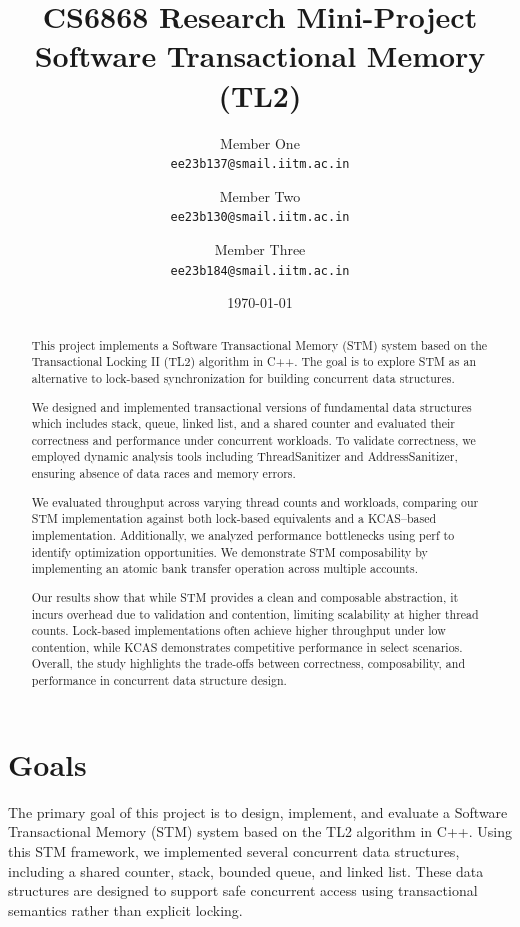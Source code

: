 \documentclass[11pt,a4paper]{article}
\title{%
  \textbf{CS6868 Research Mini-Project} \\[0.3em]
  \Large Software Transactional Memory (TL2)%
}
\author{%
  Member One \\ \texttt{ee23b137@smail.iitm.ac.in}
  \and
  Member Two \\ \texttt{ee23b130@smail.iitm.ac.in}
  \and
  Member Three \\ \texttt{ee23b184@smail.iitm.ac.in}
}
\date{\today}
\begin{document}
\maketitle

\begin{abstract}
This project implements a Software Transactional Memory (STM) system based on the Transactional Locking II (TL2) algorithm in C++. The goal is to explore STM as an alternative to lock-based synchronization for building concurrent data structures.

We designed and implemented transactional versions of fundamental data structures which includes stack, queue, linked list, and a shared counter and evaluated their correctness and performance under concurrent workloads. To validate correctness, we employed dynamic analysis tools including ThreadSanitizer and AddressSanitizer, ensuring absence of data races and memory errors.

We evaluated throughput across varying thread counts and workloads, comparing our STM implementation against both lock-based equivalents and a KCAS–based implementation. Additionally, we analyzed performance bottlenecks using perf to identify optimization opportunities.
We demonstrate STM composability by implementing an atomic bank transfer operation across multiple accounts.

Our results show that while STM provides a clean and composable abstraction, it incurs overhead due to validation and contention, limiting scalability at higher thread counts. Lock-based implementations often achieve higher throughput under low contention, while KCAS demonstrates competitive performance in select scenarios. Overall, the study highlights the trade-offs between correctness, composability, and performance in concurrent data structure design.

\end{abstract}

\section{Goals}
\label{sec:goals}

The primary goal of this project is to design, implement, and evaluate a Software Transactional Memory (STM) system based on the TL2 algorithm in C++. Using this STM framework, we implemented several concurrent data structures, including a shared counter, stack, bounded queue, and linked list. These data structures are designed to support safe concurrent access using transactional semantics rather than explicit locking.
\end{document}
